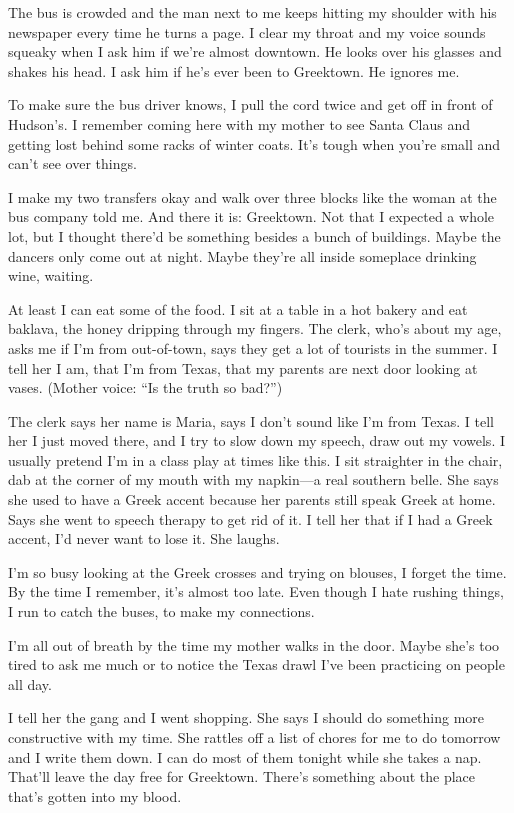 \documentclass[twoside,10pt]{book}
\begin{document}
The bus is crowded and the man next to me keeps hitting my shoulder with
his newspaper every time he turns a page. I clear my throat and my voice
sounds squeaky when I ask him if we're almost downtown. He looks over
his glasses and shakes his head. I ask him if he's ever been to
Greek­town. He ignores me.

To make sure the bus driver knows, I pull the cord twice and get off in
front of Hudson's. I remember coming here with my mother to see Santa
Claus and getting lost behind some racks of winter coats. It's tough
when you're small and can't see over things.

I make my two transfers okay and walk over three blocks like the woman
at the bus company told me. And there it is: Greektown. Not that I
expected a whole lot, but I thought there'd be some­thing besides a
bunch of buildings. Maybe the dancers only come out at night. Maybe
they're all inside someplace drinking wine, waiting.

At least I can eat some of the food. I sit at a table in a hot bakery
and eat baklava, the honey dripping through my fingers. The clerk, who's
about my age, asks me if I'm from out-of-town, says they get a lot of
tourists in the summer. I tell her I am, that I'm from Texas, that my
parents are next door looking at vases. (Mother voice: ``Is the truth so
bad?'')

The clerk says her name is Maria, says I don't sound like I'm from
Texas. I tell her I just moved there, and I try to slow down my speech,
draw out my vowels. I usually pretend I'm in a class play at times like
this. I sit straighter in the chair, dab at the corner of my mouth with
my napkin---a real southern belle. She says she used to have a Greek
accent because her parents still speak Greek at home. Says she went to
speech therapy to get rid of it. I tell her that if I had a Greek
accent, I'd never want to lose it. She laughs.

I'm so busy looking at the Greek crosses and trying on blouses, I forget
the time. By the time I remember, it's almost too late. Even though I
hate rushing things, I run to catch the buses, to make my connections.

I'm all out of breath by the time my mother walks in the door. Maybe
she's too tired to ask me much or to notice the Texas drawl I've been
practicing on people all day.

I tell her the gang and I went shopping. She says I should do something
more constructive with my time. She rattles off a list of chores for me
to do tomorrow and I write them down. I can do most of them tonight
while she takes a nap. That'll leave the day free for Greektown. There's
something about the place that's gotten into my blood.
\end{document}
